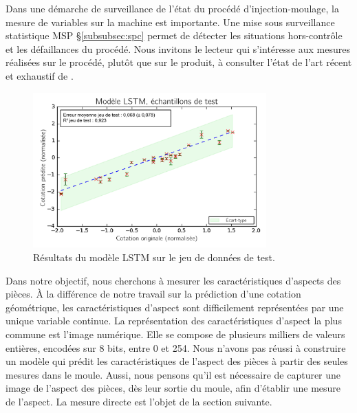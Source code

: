 Dans une démarche de surveillance de l'état du procédé d'injection-moulage, la mesure de variables sur la machine est importante.
Une mise sous surveillance statistique MSP §\ref{subsubsec:spc} permet de détecter les situations hors-contrôle et les défaillances du procédé.
Nous invitons le lecteur qui s'intéresse aux mesures réalisées sur le procédé, plutôt que sur le produit, à consulter l'état de l'art récent et exhaustif de \citeauthor{ageyeva_inmold_2019} \cite{ageyeva_inmold_2019}.

\begin{figure}[bthp]
	\centering
	\includegraphics[width=0.8\textwidth]{../Chap2/Figures/1LSTM_Cross_val_MSE_013splited_Ystd.png}
	\caption{Résultats du modèle LSTM sur le jeu de données de test.}
	\label{fig:signals_lstm}
\end{figure}

Dans notre objectif, nous cherchons à mesurer les caractéristiques d'aspects des pièces.
À la différence de notre travail sur la prédiction d'une cotation géométrique, les caractéristiques d'aspect sont difficilement représentées par une unique variable continue.
La représentation des caractéristiques d'aspect la plus commune est l'image numérique.
Elle se compose de plusieurs milliers de valeurs entières, encodées sur 8 bits, entre 0 et 254.
Nous n'avons pas réussi à construire un modèle qui prédit les caractéristiques de l'aspect des pièces à partir des seules mesures dans le moule.
Aussi, nous pensons qu'il est nécessaire de capturer une image de l'aspect des pièces, dès leur sortie du moule, afin d'établir une mesure de l'aspect.
La mesure directe est l'objet de la section suivante.

